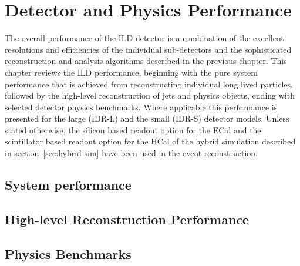 \renewcommand{\fix}[1]{\textcolor{red}{\texttt{#1}}} %


\chapter{Detector and Physics Performance}
\label{chap:performance} 
\label{ild:sec:performance}
The overall performance of the ILD detector is a combination of the excellent
resolutions and efficiencies of the individual sub-detectors and the
sophisticated reconstruction and analysis algorithms described in the previous chapter.
This chapter reviews the ILD performance, beginning with the pure system performance that
is achieved from reconstructing individual long lived particles, followed by the high-level
reconstruction of jets and physics objects, ending with selected detector physics benchmarks.
Where applicable this performance is presented for the large (IDR-L) and the small (IDR-S)
detector models. Unless stated otherwise, the silicon based readout option for the ECal and the
scintillator based readout option for the HCal of the hybrid simulation described in section~\ref{sec:hybrid-sim}
have been used in the event reconstruction.

\section{\label{sec:system-performance} System performance}




\section{\label{sec:HLR-performance} High-level Reconstruction Performance}



\section{\label{sec:benchmarks} Physics Benchmarks}


